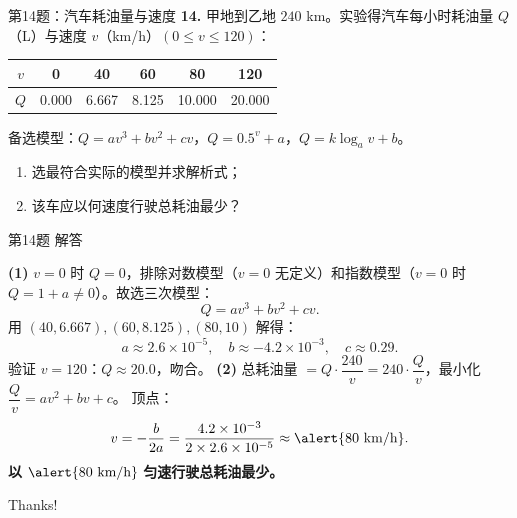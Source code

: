 \documentclass[10pt,aspectratio=169,serif]{beamer}
\begin{document}
\begin{frame}[t]{第14题：汽车耗油量与速度}
\textbf{14.} 甲地到乙地 $240$ km。实验得汽车每小时耗油量 $Q$（L）与速度 $v$（km/h）$(0\le v\le 120)$：
\smallskip
\begin{center}
\begin{tabular}{c|ccccc}
$v$ & 0 & 40 & 60 & 80 & 120\\ \hline
$Q$ & 0.000 & 6.667 & 8.125 & 10.000 & 20.000
\end{tabular}
\end{center}
备选模型：$Q=av^{3}+bv^{2}+cv$，$Q=0.5^{v}+a$，$Q=k\log_{a}v+b$。
\begin{enumerate}
  \item 选最符合实际的模型并求解析式；
  \item 该车应以何速度行驶总耗油最少？
\end{enumerate}
\end{frame}

\begin{frame}[t]{第14题 解答}
\begin{tcolorbox}[colback=orange!10,colframe=orange,title=\textbf{解}]
\textbf{(1)} $v=0$ 时 $Q=0$，排除对数模型（$v=0$ 无定义）和指数模型（$v=0$ 时 $Q=1+a\ne 0$）。故选三次模型：
\[
Q=av^{3}+bv^{2}+cv.
\]
用 $(40,6.667),(60,8.125),(80,10)$ 解得：
\[
a\approx 2.6\times 10^{-5},\quad b\approx -4.2\times 10^{-3},\quad c\approx 0.29.
\]
验证 $v=120$：$Q\approx 20.0$，吻合。
\smallskip
\textbf{(2)} 总耗油量 $=Q\cdot\dfrac{240}{v}=240\cdot\dfrac{Q}{v}$，最小化 $\dfrac{Q}{v}=av^{2}+bv+c$。
顶点：
\[
v=-\frac{b}{2a}=\frac{4.2\times 10^{-3}}{2\times 2.6\times 10^{-5}}\approx \alert{80\ \text{km/h}}.
\]
\textbf{以 }$\alert{80\text{ km/h}}$\textbf{ 匀速行驶总耗油最少。}
\end{tcolorbox}
\end{frame}

\begin{frame}[c]
  \begin{center}
    {\Huge\calligra Thanks!}
  \end{center}
\end{frame}
\end{document}
